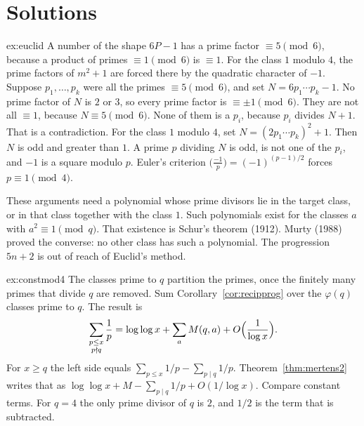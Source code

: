 \section{Solutions}

\begin{solution}{ex:euclid}
\idea A number of the shape $6P-1$ has a prime factor $\equiv5\pmod6$, because a product of primes $\equiv1\pmod6$ is $\equiv1$. For the class $1$ modulo $4$, the prime factors of $m^2+1$ are forced there by the quadratic character of $-1$.
\writeup Suppose $p_1,\dots,p_k$ were all the primes $\equiv5\pmod6$, and set $N=6p_1\cdots p_k-1$. No prime factor of $N$ is $2$ or $3$, so every prime factor is $\equiv\pm1\pmod6$. They are not all $\equiv1$, because $N\equiv5\pmod6$. None of them is a $p_i$, because $p_i$ divides $N+1$. That is a contradiction. For the class $1$ modulo $4$, set $N=(2p_1\cdots p_k)^2+1$. Then $N$ is odd and greater than $1$. A prime $p$ dividing $N$ is odd, is not one of the $p_i$, and $-1$ is a square modulo $p$. Euler's criterion $\bigl(\frac{-1}p\bigr)=(-1)^{(p-1)/2}$ forces $p\equiv1\pmod4$.

These arguments need a polynomial whose prime divisors lie in the target class, or in that class together with the class $1$. Such polynomials exist for the classes $a$ with $a^2\equiv1\pmod q$. That existence is Schur's theorem (1912). Murty (1988) proved the converse: no other class has such a polynomial. The progression $5n+2$ is out of reach of Euclid's method.
\end{solution}

\begin{solution}{ex:constmod4}
\idea The classes prime to $q$ partition the primes, once the finitely many primes that divide $q$ are removed.
\writeup Sum Corollary~\ref{cor:recipprog} over the $\varphi(q)$ classes prime to $q$. The result is
\[
\sum_{\substack{p\le x\\p\nmid q}}\frac1p=\log\log x+\sum_a M(q,a)+O\Bigl(\frac1{\log x}\Bigr).
\]
For $x\ge q$ the left side equals $\sum_{p\le x}1/p-\sum_{p\mid q}1/p$. Theorem~\ref{thm:mertens2} writes that as $\log\log x+M-\sum_{p\mid q}1/p+O(1/\log x)$. Compare constant terms. For $q=4$ the only prime divisor of $q$ is $2$, and $1/2$ is the term that is subtracted.
\end{solution}

